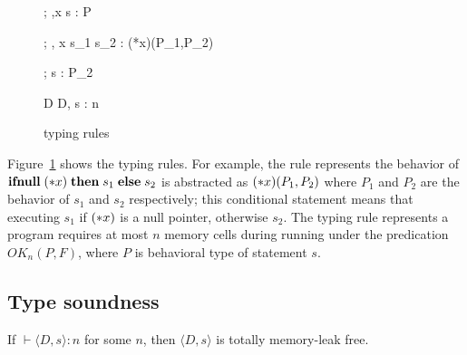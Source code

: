 \begin{figure}
\begin{minipage}{\textwidth}
{\Theta ; \Gamma,x \vdash \scon\Sirx s : \scon\Sirx P}


{\Theta ; \Gamma, x \vdash \IFNULL\Sirx \; \THEN s_{1}\; \ELSE s_{2} : (*x)(P_1,P_2)}


{\Theta ; \Gamma \vdash s : P_{2}}

        {\vdash D \COL \Theta}
{\vdash \langle D, s \rangle : n}

\end{minipage}
\caption{typing rules}
\label{fig:TypingRules}
\end{figure}

Figure~\ref{fig:TypingRules} shows the typing rules. For example, the
rule  represents the behavior of \(\mathbf{ifnull}\;(*x) \; \mathbf{then}\;
s_{1}\; \mathbf{else}\; s_{2}\) is abstracted as \((*x)(P_1, P_2)\) where
\(P_1\) and \(P_2\) are the behavior of \(s_1\) and \(s_2\)
respectively; this conditional statement means that executing \(s_1\)
if \((*x)\) is a null pointer, otherwise \(s_2\).  The typing rule
 represents a program requires at most \(n\) memory
cells during running under the predication \(OK_n(P, F)\), where \(P\)
is behavioral type of statement \(s\).


\subsection{Type soundness}
\begin{theorem}\label{thm1}
If $\vdash \langle D, s \rangle : n$ for some \(n\), then \(\langle D,
s \rangle\) is totally memory-leak free.
\end{theorem}

